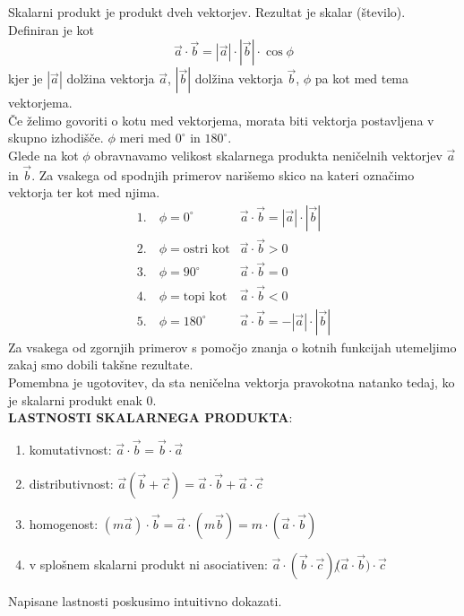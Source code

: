 \documentclass[a4paper,11pt]{article}
\begin{document}
Skalarni produkt je produkt dveh vektorjev. Rezultat je skalar (število). Definiran je kot $$\vec{a}\cdot\vec{b}=|\vec{a}|\cdot|\vec{b}|\cdot \cos\phi$$ kjer je $|\vec{a}|$ dolžina vektorja $\vec{a}$,  $|\vec{b}|$ dolžina vektorja $\vec{b}$, $\phi$ pa kot med tema vektorjema.\\
Če želimo govoriti o kotu med vektorjema, morata biti vektorja postavljena v skupno izhodišče. $\phi$ meri med $0^\circ$ in $180^\circ$.\\
Glede na kot $\phi$ obravnavamo velikost skalarnega produkta neničelnih vektorjev $\vec{a}$ in $\vec{b}$. Za vsakega od spodnjih primerov narišemo skico na kateri označimo vektorja ter kot med njima.
\[
\begin{array}{ll}
1. \quad \phi =0^\circ      & \vec{a}\cdot\vec{b}=|\vec{a}|\cdot|\vec{b}| \\[4pt]
2. \quad \phi = \text{ostri kot} & \vec{a}\cdot\vec{b}>0 \\[4pt]
3. \quad \phi =90^\circ     & \vec{a}\cdot\vec{b}=0 \\[4pt]
4. \quad \phi = \text{topi kot}  & \vec{a}\cdot\vec{b}<0 \\[4pt]
5. \quad \phi =180^\circ    & \vec{a}\cdot\vec{b}=-|\vec{a}|\cdot|\vec{b}|
\end{array}
\]
Za vsakega od zgornjih primerov s pomočjo znanja o kotnih funkcijah utemeljimo zakaj smo dobili takšne rezultate.\\
Pomembna je ugotovitev, da sta neničelna vektorja pravokotna natanko tedaj, ko je skalarni produkt enak 0.\\

\textbf{LASTNOSTI SKALARNEGA PRODUKTA}:
\begin{enumerate}
    \item komutativnost: $\vec{a}\cdot\vec{b}= \vec{b}\cdot\vec{a}$
    \item distributivnost: $\vec{a}(\vec{b}+\vec{c})=\vec{a}\cdot\vec{b}+\vec{a}\cdot\vec{c}$
    \item homogenost: $(m\vec{a})\cdot\vec{b}=\vec{a}\cdot(m\vec{b})=m\cdot(\vec{a}\cdot\vec{b})$
    \item v splošnem skalarni produkt ni asociativen: $\vec{a}\cdot(\vec{b}\cdot\vec{c})\not (\vec{a}\cdot\vec{b})\cdot\vec{c}$
\end{enumerate}
Napisane lastnosti poskusimo intuitivno dokazati.\\
\end{document}
